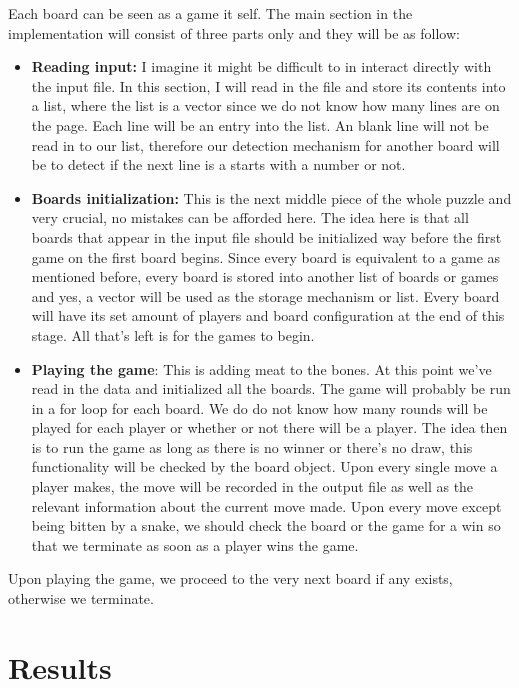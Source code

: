 Each board can be seen as a game it self. The main section in the implementation will consist of three parts only and they will be as follow:


\begin{itemize}
	
	\item \textbf{Reading input:} I imagine it might be difficult to in interact directly with the input file. In this section, I will read in the file and store its contents into a list, where the list is a vector since we do not know how many lines are on the page. Each line will be an entry into the list. An blank line will not be read in to our list, therefore our detection mechanism for another board will be to detect if the next line is a starts with a number or not.
	\item \textbf{Boards initialization:} This is the next middle piece of the whole puzzle and very crucial, no mistakes can be afforded here. The idea here is that all boards that appear in the input file should be initialized way before the first game on the first board begins. Since every board is equivalent to a game as mentioned before, every board is stored into another list of boards or games and yes, a vector will be used as the storage mechanism or list. Every board will have its set amount of players and board configuration at the end of this stage. All that's left is for the games to begin.
	\item \textbf{Playing the game}: This is adding meat to the bones. At this point we've read in the data and initialized all the boards. The game will probably be run in a for loop for each board. We do do not know how many rounds will be played for each player or whether or not there will be a player. The idea then is to run the game as long as there is no winner or there's no draw, this functionality will be checked by the board object. Upon every single move a player makes, the move will be recorded in the output file as well as the relevant information about the current move made. Upon every move except being bitten by a snake, we should check the board or the game for a win so that we terminate as soon as a player wins the game. 
\end{itemize}
Upon playing the game, we proceed to the very next board if any exists, otherwise we terminate.

\section*{Results}

